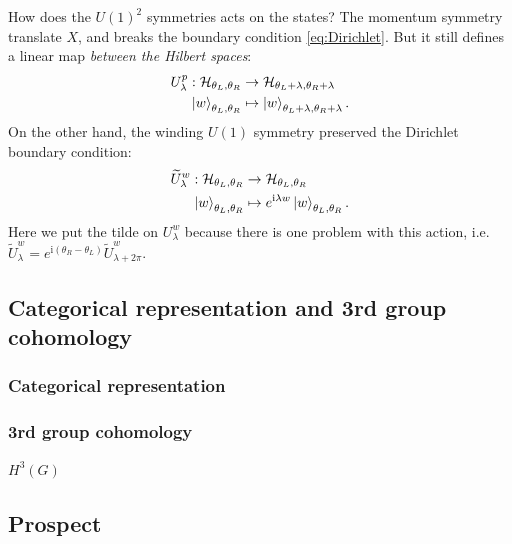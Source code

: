 \documentclass[
]{scrartcl}
\numberwithin{equation}{section}
\renewenvironment{align}{\begin{equation}\begin{aligned}}{\end{aligned}\end{equation}}
\theoremstyle{definition}
\theoremstyle{definition}
\theoremstyle{definition}
\theoremstyle{definition}
\theoremstyle{remark}
\begin{document}
How does the \(U(1)^2\) symmetries acts on the states?
The momentum symmetry translate \(X\), and breaks the boundary condition \eqref{eq:Dirichlet}.
But it still defines a linear map \emph{between the Hilbert spaces}:
\begin{align}
    \label{eq:UpactDirichlet}
    U^p_\lambda : \mathcal{H}_{\theta_L,\theta_R} &\to \mathcal{H}_{\theta_L+\lambda,\theta_R+\lambda}\\
    \ket{w}_{\theta_L,\theta_R} &\mapsto \ket{w}_{\theta_L+\lambda,\theta_R+\lambda}.
\end{align}
On the other hand, the winding \(U(1)\) symmetry preserved the Dirichlet boundary condition:
\begin{align}
    \label{eq:UwactDirichlet}
    \widetilde{U}^w_\lambda : \mathcal{H}_{\theta_L,\theta_R} &\to \mathcal{H}_{\theta_L,\theta_R}\\
    \ket{w}_{\theta_L,\theta_R} &\mapsto e^{\mathrm{i}\lambda w}\ket{w}_{\theta_L,\theta_R}.
\end{align}
Here we put the tilde on \(U^w_\lambda\) because there is one problem with this action, i.e.~\(\widetilde{U}^w_\lambda = e^{\mathrm{i}(\theta_R-\theta_L)}\widetilde{U}^w_{\lambda+2\pi}\).

\hypertarget{categorical-representation-and-3rd-group-cohomology}{%
\subsection{Categorical representation and 3rd group cohomology}\label{categorical-representation-and-3rd-group-cohomology}}

\hypertarget{categorical-representation}{%
\subsubsection{Categorical representation}\label{categorical-representation}}

\hypertarget{rd-group-cohomology}{%
\subsubsection{3rd group cohomology}\label{rd-group-cohomology}}

\(H^3(G)\)

\hypertarget{prospect}{%
\subsection{Prospect}\label{prospect}}

\printbibliography
\end{document}
